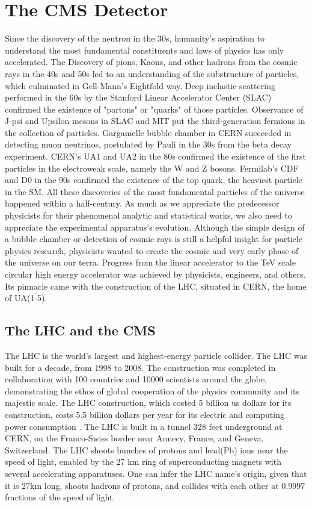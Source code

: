 \chapter{The CMS Detector}\label{sec:detectors}
Since the discovery of the neutron in the 30s, humanity's aspiration to understand the most fundamental constituents and laws of physics has only accelerated.
The Discovery of pions, Kaons, and other hadrons from the cosmic rays in the 40s and 50s led to an understanding of the substructure of particles, which culminated in Gell-Mann's Eightfold way.
Deep inelastic scattering performed in the 60s by the Stanford Linear Accelerator Center (SLAC) confirmed the existence of "partons" or "quarks" of those particles.
Observance of J-psi and Upsilon mesons in SLAC and MIT put the third-generation fermions in the collection of particles.
Gargamelle bubble chamber in CERN succeeded in detecting muon neutrinos, postulated by Pauli in the 30s from the beta decay experiment.
CERN's UA1 and UA2 in the 80s confirmed the existence of the first particles in the electroweak scale, namely the W and Z bosons.
Fermilab's CDF and D0 in the 90s confirmed the existence of the top quark, the heaviest particle in the SM.
All these discoveries of the most fundamental particles of the universe happened within a half-century.
As much as we appreciate the predecessor physicists for their phenomenal analytic and statistical works, we also need to appreciate the experimental apparatus's evolution.
Although the simple design of a bubble chamber or detection of cosmic rays is still a helpful insight for particle physics research, physicists wanted to create the cosmic and very early phase of the universe on our terra.
Progress from the linear accelerator to the TeV scale circular high energy accelerator was achieved by physicists, engineers, and others.
Its pinnacle came with the construction of the LHC, situated in CERN, the home of UA(1-5).


\section{The LHC and the CMS}
The LHC is the world's largest and highest-energy particle collider.
The LHC was built for a decade, from 1998 to 2008.
The construction was completed in collaboration with 100 countries and 10000 scientists around the globe, demonstrating the ethos of global cooperation of the physics community and its majestic scale.
The LHC construction, which costed 5 billion us dollars for its construction, costs 5.5 billion dollars per year for its electric and computing power consumption \cite{LHCweb}.
The LHC is built in a tunnel 328 feet underground at CERN, on the Franco-Swiss border near Annecy, France, and  Geneva, Switzerland.
The LHC shoots bunches of protons and lead(Pb) ions near the speed of light, enabled by the 27 km ring of superconducting magnets with several accelerating apparatuses.
One can infer the LHC name's origin, given that it is 27km long, shoots hadrons of protons, and collides with each other at 0.9997 fractions of the speed of light.

